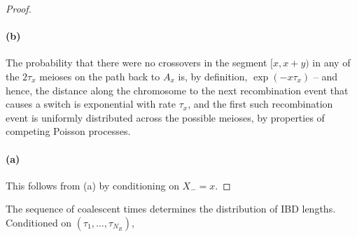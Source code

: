 \begin{proof}

  \paragraph{(b)} The probability that there were no crossovers in the segment $[x,x+y)$ in any of the $2\tau_x$ meioses on the path back to $A_x$
  is, by definition, $\exp(-x \tau_x)$ -- and hence, the distance along the chromosome to the next recombination event that causes a switch is exponential with rate $\tau_x$,
  and the first such recombination event is uniformly distributed across the possible meioses,
  by properties of competing Poisson processes.

  \paragraph{(a)} This follows from (a) by conditioning on $X_- = x$.

\end{proof}

\begin{lemma}{The sequence of coalescent times determines the distribution of IBD lengths.}
  Conditioned on $(\tau_1, \ldots, \tau_{N_R})$, 
\end{lemma}


